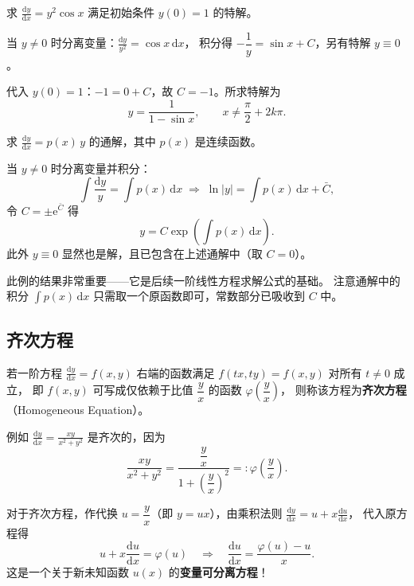 \documentclass[lang=cn,11pt]{elegantbook}
\begin{document}
\begin{exercise}
求 $\displaystyle\frac{\mathrm{d}y}{\mathrm{d}x}=y^{2}\cos x$ 满足初始条件 $y(0)=1$ 的特解。
\end{exercise}
\begin{solution}
当 $y\neq 0$ 时分离变量：$\displaystyle\frac{\mathrm{d}y}{y^{2}}=\cos x\,\mathrm{d}x$，
积分得 $-\dfrac{1}{y}=\sin x + C$，另有特解 $y\equiv 0$。

代入 $y(0)=1$：$-1=0+C$，故 $C=-1$。所求特解为
\[
\boxed{y=\frac{1}{1-\sin x}},\qquad x\neq\frac{\pi}{2}+2k\pi.
\]
\end{solution}

\begin{exercise} \label{ex:sep-linear-homog}
求 $\displaystyle\frac{\mathrm{d}y}{\mathrm{d}x}=p(x)\,y$ 的通解，其中 $p(x)$ 是连续函数。
\end{exercise}
\begin{solution}
当 $y\neq 0$ 时分离变量并积分：
\[
\int\frac{\mathrm{d}y}{y}=\int p(x)\,\mathrm{d}x
\;\Longrightarrow\;
\ln|y|=\int p(x)\,\mathrm{d}x+\bar{C},
\]
令 $C=\pm\mathrm{e}^{\bar{C}}$ 得
\[
\boxed{y=C\exp\!\left(\int p(x)\,\mathrm{d}x\right)}.
\]
此外 $y\equiv 0$ 显然也是解，且已包含在上述通解中（取 $C=0$）。
\end{solution}

\begin{note}
此例的结果非常重要——它是后续一阶线性方程求解公式的基础。
注意通解中的积分 $\int p(x)\,\mathrm{d}x$ 只需取一个原函数即可，常数部分已吸收到 $C$ 中。
\end{note}

\subsection{齐次方程}

\begin{definition}[齐次方程] \label{def:homogeneous-ode}
若一阶方程 $\displaystyle\frac{\mathrm{d}y}{\mathrm{d}x}=f(x,y)$ 右端的函数满足
$f(tx,ty)=f(x,y)$ 对所有 $t\neq 0$ 成立，
即 $f(x,y)$ 可写成仅依赖于比值 $\dfrac{y}{x}$ 的函数 $\varphi\!\left(\dfrac{y}{x}\right)$，
则称该方程为\textbf{齐次方程}（Homogeneous Equation）。

例如 $\displaystyle\frac{\mathrm{d}y}{\mathrm{d}x}=\frac{xy}{x^{2}+y^{2}}$ 是齐次的，因为
\[
\frac{xy}{x^{2}+y^{2}}
=\frac{\dfrac{y}{x}}{1+\left(\dfrac{y}{x}\right)^{2}}
=: \varphi\!\left(\frac{y}{x}\right).
\]
\end{definition}

对于齐次方程，作代换 $u=\dfrac{y}{x}$（即 $y=ux$），由乘积法则
$\displaystyle\frac{\mathrm{d}y}{\mathrm{d}x}=u+x\frac{\mathrm{d}u}{\mathrm{d}x}$，
代入原方程得
\[
u+x\frac{\mathrm{d}u}{\mathrm{d}x}=\varphi(u)
\quad\Longrightarrow\quad
\frac{\mathrm{d}u}{\mathrm{d}x}=\frac{\varphi(u)-u}{x}. \tag{5.2}
\]
这是一个关于新未知函数 $u(x)$ 的\textbf{变量可分离方程}！
\end{document}
